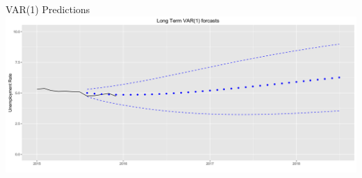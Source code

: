\documentclass[ignorenonframetext]{beamer}
\begin{document}
  	\begin{frame}{VAR(1) Predictions}
 \includegraphics[width=\textwidth]{images/zoomedvar}
  	\end{frame}
 
     
\end{document}
